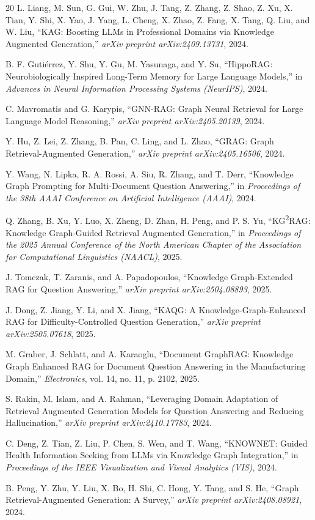 \documentclass[conference]{IEEEtran}
\begin{document}
\begin{thebibliography}{20}
L. Liang, M. Sun, G. Gui, W. Zhu, J. Tang, Z. Zhang, Z. Shao, Z. Xu, X. Tian, Y. Shi, X. Yao, J. Yang, L. Cheng, X. Zhao, Z. Fang, X. Tang, Q. Liu, and W. Liu, ``KAG: Boosting LLMs in Professional Domains via Knowledge Augmented Generation,'' \textit{arXiv preprint arXiv:2409.13731}, 2024.

B. F. Guti\'{e}rrez, Y. Shu, Y. Gu, M. Yasunaga, and Y. Su, ``HippoRAG: Neurobiologically Inspired Long-Term Memory for Large Language Models,'' in \textit{Advances in Neural Information Processing Systems (NeurIPS)}, 2024.

C. Mavromatis and G. Karypis, ``GNN-RAG: Graph Neural Retrieval for Large Language Model Reasoning,'' \textit{arXiv preprint arXiv:2405.20139}, 2024.

Y. Hu, Z. Lei, Z. Zhang, B. Pan, C. Ling, and L. Zhao, ``GRAG: Graph Retrieval-Augmented Generation,'' \textit{arXiv preprint arXiv:2405.16506}, 2024.

Y. Wang, N. Lipka, R. A. Rossi, A. Siu, R. Zhang, and T. Derr, ``Knowledge Graph Prompting for Multi-Document Question Answering,'' in \textit{Proceedings of the 38th AAAI Conference on Artificial Intelligence (AAAI)}, 2024.

Q. Zhang, B. Xu, Y. Luo, X. Zheng, D. Zhan, H. Peng, and P. S. Yu, ``KG\textsuperscript{2}RAG: Knowledge Graph-Guided Retrieval Augmented Generation,'' in \textit{Proceedings of the 2025 Annual Conference of the North American Chapter of the Association for Computational Linguistics (NAACL)}, 2025.

J. Tomczak, T. Zaranis, and A. Papadopoulos, ``Knowledge Graph-Extended RAG for Question Answering,'' \textit{arXiv preprint arXiv:2504.08893}, 2025.

J. Dong, Z. Jiang, Y. Li, and X. Jiang, ``KAQG: A Knowledge-Graph-Enhanced RAG for Difficulty-Controlled Question Generation,'' \textit{arXiv preprint arXiv:2505.07618}, 2025.

M. Graber, J. Schlatt, and A. Karaoglu, ``Document GraphRAG: Knowledge Graph Enhanced RAG for Document Question Answering in the Manufacturing Domain,'' \textit{Electronics}, vol. 14, no. 11, p. 2102, 2025.

S. Rakin, M. Islam, and A. Rahman, ``Leveraging Domain Adaptation of Retrieval Augmented Generation Models for Question Answering and Reducing Hallucination,'' \textit{arXiv preprint arXiv:2410.17783}, 2024.

C. Deng, Z. Tian, Z. Liu, P. Chen, S. Wen, and T. Wang, ``KNOWNET: Guided Health Information Seeking from LLMs via Knowledge Graph Integration,'' in \textit{Proceedings of the IEEE Visualization and Visual Analytics (VIS)}, 2024.

B. Peng, Y. Zhu, Y. Liu, X. Bo, H. Shi, C. Hong, Y. Tang, and S. He, ``Graph Retrieval-Augmented Generation: A Survey,'' \textit{arXiv preprint arXiv:2408.08921}, 2024.

\end{thebibliography}
\end{document}
